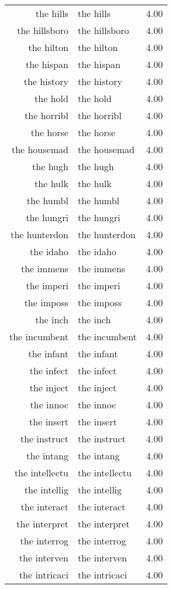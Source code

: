 \begin{table}[ht]
\begin{tabular}{rlr}
  the hills & the hills & 4.00 \\ 
  the hillsboro & the hillsboro & 4.00 \\ 
  the hilton & the hilton & 4.00 \\ 
  the hispan & the hispan & 4.00 \\ 
  the history & the history & 4.00 \\ 
  the hold & the hold & 4.00 \\ 
  the horribl & the horribl & 4.00 \\ 
  the horse & the horse & 4.00 \\ 
  the housemad & the housemad & 4.00 \\ 
  the hugh & the hugh & 4.00 \\ 
  the hulk & the hulk & 4.00 \\ 
  the humbl & the humbl & 4.00 \\ 
  the hungri & the hungri & 4.00 \\ 
  the hunterdon & the hunterdon & 4.00 \\ 
  the idaho & the idaho & 4.00 \\ 
  the immens & the immens & 4.00 \\ 
  the imperi & the imperi & 4.00 \\ 
  the imposs & the imposs & 4.00 \\ 
  the inch & the inch & 4.00 \\ 
  the incumbent & the incumbent & 4.00 \\ 
  the infant & the infant & 4.00 \\ 
  the infect & the infect & 4.00 \\ 
  the inject & the inject & 4.00 \\ 
  the innoc & the innoc & 4.00 \\ 
  the insert & the insert & 4.00 \\ 
  the instruct & the instruct & 4.00 \\ 
  the intang & the intang & 4.00 \\ 
  the intellectu & the intellectu & 4.00 \\ 
  the intellig & the intellig & 4.00 \\ 
  the interact & the interact & 4.00 \\ 
  the interpret & the interpret & 4.00 \\ 
  the interrog & the interrog & 4.00 \\ 
  the interven & the interven & 4.00 \\ 
  the intricaci & the intricaci & 4.00 \\ 

\end{tabular}
\end{table}
